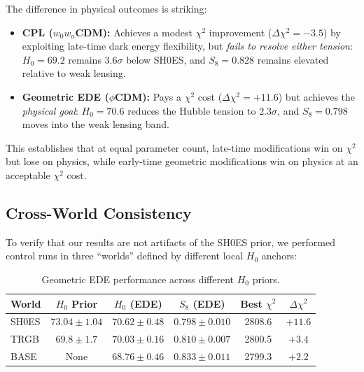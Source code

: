 The difference in physical outcomes is striking:

\begin{itemize}
    \item \textbf{CPL ($w_0w_a$CDM):} Achieves a modest $\chi^2$ improvement ($\Delta\chi^2 = -3.5$) by exploiting late-time dark energy flexibility, but \emph{fails to resolve either tension}: $H_0 = 69.2$ remains $3.6\sigma$ below SH0ES, and $S_8 = 0.828$ remains elevated relative to weak lensing.
    
    \item \textbf{Geometric EDE ($\phi$CDM):} Pays a $\chi^2$ cost ($\Delta\chi^2 = +11.6$) but achieves the \emph{physical goal}: $H_0 = 70.6$ reduces the Hubble tension to $2.3\sigma$, and $S_8 = 0.798$ moves into the weak lensing band.
\end{itemize}

This establishes that at equal parameter count, late-time modifications win on $\chi^2$ but lose on physics, while early-time geometric modifications win on physics at an acceptable $\chi^2$ cost.

\subsection{Cross-World Consistency}

To verify that our results are not artifacts of the SH0ES prior, we performed control runs in three ``worlds'' defined by different local $H_0$ anchors:

\begin{table}[h]
\centering
\caption{Geometric EDE performance across different $H_0$ priors.}
\label{tab:cross_world}
\begin{tabular}{lccccc}
\hline\hline
World & $H_0$ Prior & $H_0$ (EDE) & $S_8$ (EDE) & Best $\chi^2$ & $\Delta\chi^2$ \\
\hline
SH0ES & $73.04 \pm 1.04$ & $70.62 \pm 0.48$ & $0.798 \pm 0.010$ & 2808.6 & $+11.6$ \\
TRGB & $69.8 \pm 1.7$ & $70.03 \pm 0.16$ & $0.810 \pm 0.007$ & 2800.5 & $+3.4$ \\
BASE & None & $68.76 \pm 0.46$ & $0.833 \pm 0.011$ & 2799.3 & $+2.2$ \\
\hline\hline
\end{tabular}
\end{table}

